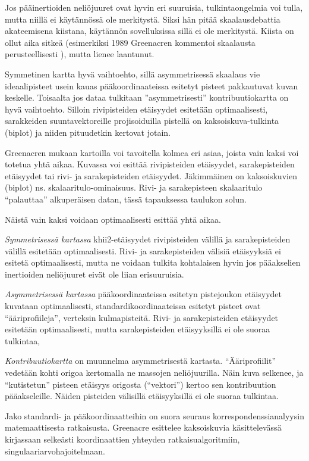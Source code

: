 \documentclass[
  finnish,
]{book}
\begin{document}
Jos pääinertioiden neliöjuuret ovat hyvin eri suuruisia, tulkintaongelmia voi tulla, mutta
niillä ei käytännössä ole merkitystä. Siksi hän pitää skaalausdebattia akateemisena
kiistana, käytännön sovelluksissa sillä ei ole merkitystä. Kiista on ollut aika
sitkeä (esimerkiksi 1989 Greenacren kommentoi skaalausta perusteellisesti \citep{RefWorks:doc:5c754c6de4b0947789165cde}), mutta lienee laantunut.

Symmetinen kartta hyvä vaihtoehto, sillä asymmetrisessä skaalaus vie
ideaalipisteet usein kauas pääkoordinaateissa esitetyt pisteet pakkautuvat kuvan
keskelle. Toisaalta jos dataa tulkitaan ''asymmetrisesti'' kontribuutiokartta on
hyvä vaihtoehto. Silloin rivipisteiden etäisyydet esitetään optimaalisesti,
sarakkeiden suuntavektoreille projisoiduilla pistellä on kaksoiskuva-tulkinta
(biplot) ja niiden pituudetkin kertovat jotain.

Greenacren mukaan kartoilla voi tavoitella kolmea eri asiaa, joista vain kaksi
voi totetua yhtä aikaa. Kuvassa voi esittää rivipisteiden etäisyydet,
sarakepisteiden etäisyydet tai rivi- ja sarakepisteiden etäisyydet. Jäkimmäinen on
kaksoiskuvien (biplot) ns. skalaaritulo-ominaisuus. Rivi- ja sarakepisteen
skalaaritulo ``palauttaa'' alkuperäisen datan, tässä tapauksessa taulukon solun.

Näistä vain kaksi voidaan optimaalisesti esittää yhtä aikaa.

\emph{Symmetrisessä kartassa} khii2-etäisyydet rivipisteiden välillä ja sarakepisteiden
välillä esitetään optimaalisesti. Rivi- ja sarakepisteiden välisiä etäisyyksiä ei
esitetä optimaalisesti, mutta ne voidaan tulkita kohtalaisen hyvin jos pääakselien
inertioiden neliöjuuret eivät ole liian erisuuruisia.

\emph{Asymmetrisessä kartassa} pääkoordinaateissa esitetyn pistejoukon etäisyydet
kuvataan optimaalisesti, standardikoordinaateissa esitetyt pisteet ovat ``ääriprofiileja'',
verteksin kulmapisteitä. Rivi- ja sarakepisteiden etäisyydet esitetään optimaalisesti,
mutta sarakepisteiden etäisyyksillä ei ole suoraa tulkintaa,

\emph{Kontribuutiokartta} on muunnelma asymmetrisestä kartasta. ``Ääriprofiilit'' vedetään
kohti origoa kertomalla ne massojen neliöjuurilla. Näin kuva selkenee, ja ``kutistetun''
pisteen etäisyys origosta (``vektori'') kertoo sen kontribuution pääakseleille. Näiden pisteiden
välisillä etäisyyksillä ei ole suoraa tulkintaa.

Jako standardi- ja pääkoordinaatteihin on suora seuraus korrespondenssianalyysin
matemaattisesta ratkaisusta. Greenacre esittelee kaksoiskuvia käsittelevässä
kirjassaan \citep{RefWorks:doc:5a857a43e4b0ed2d44664d7c} selkeästi koordinaattien
yhteyden ratkaisualgoritmiin, singulaariarvohajoitelmaan.
\end{document}
